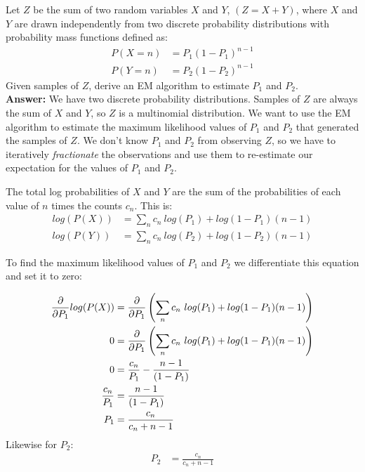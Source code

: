 \documentclass[11pt]{article}
\begin{document}
Let $Z$ be the sum of two random variables $X$ and $Y$, $(Z=X+Y)$, where $X$ and $Y$ are drawn independently from two discrete probability distributions with probability mass functions defined as:
\begin{align}
P(X=n) &= P_1(1-P_1)^{n-1}\\
P(Y=n) &= P_2(1-P_2)^{n-1}
\end{align}
Given samples of $Z$, derive an EM algorithm to estimate $P_1$ and $P_2$.
\\[5pt]\textbf{Answer:}
We have two discrete probability distributions. Samples of $Z$ are always the sum of $X$ and $Y$, so $Z$ is a multinomial distribution. We want to use the EM algorithm to estimate the maximum likelihood values of $P_1$ and $P_2$ that generated the samples of $Z$. We don't know $P_1$ and $P_2$ from observing $Z$, so we have to iteratively \textit{fractionate} the observations and use them to re-estimate our expectation for the values of $P_1$ and $P_2$.

The total log probabilities of $X$ and $Y$ are the sum of the probabilities of each value of $n$ times the counts $c_n$. This is:
\begin{align}
log(P(X)) &= \sum_n c_n \ log(P_1)  + log(1 - P_1)(n - 1) \\
log(P(Y)) &= \sum_n c_n \ log(P_2)  + log(1 - P_2)(n - 1)
\end{align}

To find the maximum likelihood values of $P_1$ and $P_2$ we differentiate this equation and set it to zero:

\begin{align}
\pdv{}{P_1}log(P(X)) &= \pdv{}{P_1}\left(\sum_n c_n \ log(P_1)  + log(1 - P_1)(n - 1)\right) 
\\
0 &= \pdv{}{P_1}\left(\sum_n c_n \ log(P_1)  + log(1 - P_1)(n - 1)\right)
 \\
0 &= \frac{c_n}{P_1}  - \frac{n - 1}{(1 - P_1)
}\\
\frac{c_n}{P_1}  &= \frac{n - 1}{(1 - P_1)}
\\
P_1 &= \frac{c_n}{c_n + n - 1}
\end{align}
Likewise for $P_2$:
\begin{align}
P_2 &= \frac{c_n}{c_n + n - 1}
\end{align}
\end{document}
